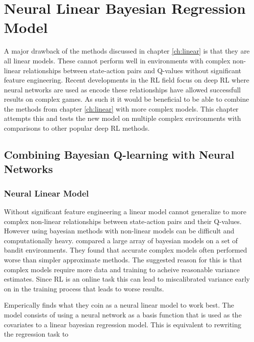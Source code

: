 
\chapter{Neural Linear Bayesian Regression Model}\label{ch:bdqn}

A major drawback of the methods discussed in chapter \ref{ch:linear} is that they are all linear models. These cannot perform well in environments with complex non-linear relationships between state-action pairs and Q-values without significant feature engineering. Recent developments in the RL field focus on deep RL\citep{mnih_2015, mnih_2016,silver_2017} where neural networks are used as encode these relationships have allowed successfull results on complex games. As such it it would be beneficial to be able to combine the methods from chapter \ref{ch:linear} with more complex models. This chapter attempts this and tests the new model on multiple complex environments with comparisons to other popular deep RL methods.

\section{Combining Bayesian Q-learning with Neural Networks}

\subsection{Neural Linear Model}

Without significant feature engineering a linear model cannot generalize to more complex non-linear relationships between state-action pairs and their Q-values. However using bayesian methods with non-linear models can be difficult and computationally heavy. \cite{carlos_2018} compared a large array of bayesian models on a set of bandit environments. They found that accurate complex models often performed worse than simpler approximate methods. The suggested reason for this is that complex models require more data and training to acheive reasonable variance estimates. Since RL is an online task this can lead to miscalibrated variance early on in the training process that leads to worse results.

Emperically \cite{carlos_2018} finds what they coin as a neural linear model to work best. The model consists of using a neural network as a basis function that is used as the covariates to a linear bayesian regression model. This is equivalent to rewriting the regression task to 

